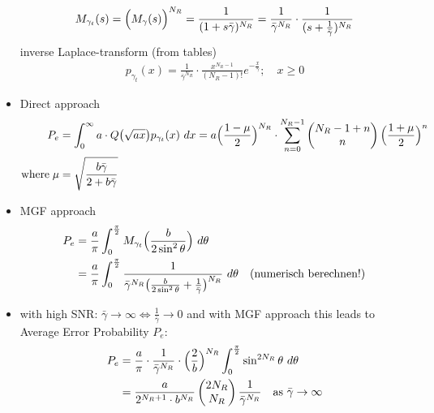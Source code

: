\documentclass[a4paper, 10pt]{article}
\begin{document}
\begin{itemize}
			\begin{align*}
				M_{\gamma _t}(s) = \Bigl (M_\gamma (s)\Bigr )^{N_R} = \frac{1}{(1 + s\bar{\gamma})^{N_R}} = \frac{1}{\bar{\gamma}^{N_R}}\cdot \frac{1}{(s + \frac{1}{\bar{\gamma}})^{N_R}}
			\end{align*}
			inverse Laplace-transform (from tables)
			\begin{align*}
				p_{\gamma _t}(x) = \frac{1}{\bar{\gamma}^{N_R}}\cdot \frac{x^{N_R-1}}{(N_R - 1)!}e^{-\frac{x}{\bar{\gamma}}};\quad x\geq 0
			\end{align*}
	\item Direct approach 
		\begin{align*}
			P_e &= \int_{0}^{\infty}a\cdot Q\bigl (\sqrt{ax} \bigr )p_{\gamma _t}(x)~dx = a\Bigl (\frac{1 - \mu}{2}\Bigr )^{N_R} \cdot \sum_{n = 0}^{N_R - 1}\begin{pmatrix} N_R - 1 + n \\ n\end{pmatrix}\Bigl (\frac{1 + \mu}{2}\Bigr )^n \\ \text{where}\; \mu &= \sqrt{\frac{b\bar{\gamma}}{2 + b\bar{\gamma}}}
		\end{align*}
		\item MGF approach
			\begin{align*}
				P_e &= \frac{a}{\pi}\int_{0}^{\frac{\pi}{2}}M_{\gamma _t}\Bigl ( \frac{b}{2\sin ^2\theta}\Bigr )~d\theta \\
				&= \frac{a}{\pi}\int_{0}^{\frac{\pi}{2}}\frac{1}{\bar{\gamma}^{N_R}\bigl (\frac{b}{2\sin ^2\theta} + \frac{1}{\bar{\gamma}}\bigr )^{N_R}}~d\theta \quad \text{(numerisch berechnen!)}
			\end{align*}
			\item with high SNR: \quad \begin{math}\bar{\gamma}\rightarrow \infty \Longleftrightarrow \frac{1}{\bar{\gamma}}\rightarrow 0 \end{math} and with MGF approach this leads to Average Error Probability $P_e$:
	\begin{align*}
		P_e &= \frac{a}{\pi}\cdot\frac{1}{\bar{\gamma}^{N_R}}\cdot \Bigl (\frac{2}{b}\Bigr )^{N_R}\int_{0}^{\frac{\pi}{2}}\sin ^{2N_R}\theta ~d\theta \\
		&= \frac{a}{2^{N_R+1}\cdot b^{N_R}}\begin{pmatrix}2N_R \\ N_R\end{pmatrix}\frac{1}{\bar{\gamma}^{N_R}}\quad \text{as } \bar{\gamma} \rightarrow \infty \\ 

\end{align*}
\end{itemize}
\end{document}
